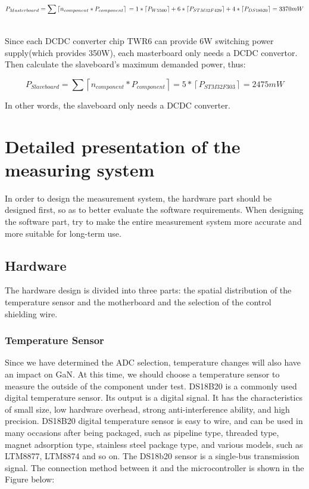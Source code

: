 \begin{center} 
\begin{equation}
P_{Masterboard} = \sum \left \lceil n_{component}*P_{component}\right \rceil 
\\
=1*\left \lceil P_{W5500}  \right \rceil +6* \left \lceil P_{STM32F429}  \right \rceil+ 4* \left \lceil P_{DS18b20}\right \rceil = 3370mW
\end{equation}
\end{center}
\\
Since each DCDC converter chip TWR6 can provide 6W switching power supply(which provides 350W), each masterboard only needs a DCDC convertor. 
Then calculate the slaveboard’s maximum demanded power, thus: 
\begin{center} 
\begin{equation}
P_{Slaveboard} = \sum \left \lceil n_{component}*P_{component}\right \rceil=5* \left \lceil P_{STM32F303}  \right \rceil= 2475mW
\end{equation}
\end{center}
In other words, the slaveboard only needs a DCDC converter.

\chapter{Detailed presentation of the measuring system}
\label{chap:Detailed presentation of the measuring system}
In order to design the measurement system, the hardware part should be designed first, so as to better evaluate the software requirements. When designing the software part, try to make the entire measurement system more accurate and more suitable for long-term use.

\section{Hardware}
\label{sec:Hardware}
The hardware design is divided into three parts: the spatial distribution of the temperature sensor and the motherboard and the selection of the control shielding wire.
\subsection{Temperature Sensor}
\label{sec:Temperature Sensor}
Since we have determined the ADC selection, temperature changes will also
have an impact on GaN.
At this time, we should choose a temperature sensor to measure the outside
of the component under test.
DS18B20 is a commonly used digital temperature sensor. Its output is a digital
signal. It has the characteristics of small size, low hardware overhead, strong
anti-interference ability, and high precision. DS18B20 digital temperature
sensor is easy to wire, and can be used in many occasions after being
packaged, such as pipeline type, threaded type, magnet adsorption type,
stainless steel package type, and various models, such as LTM8877, LTM8874
and so on.
The DS18b20 sensor is a single-bus transmission signal. The connection
method between it and the microcontroller is shown in the Figure below:

